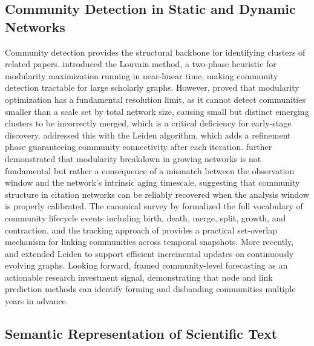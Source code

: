 \documentclass[a4paper,12pt]{article}
\begin{document}
\subsection{Community Detection in Static and Dynamic Networks}
Community detection provides the structural backbone for identifying clusters of related papers. \parencite{blondel_fast_2008} introduced the Louvain method, a two-phase heuristic for modularity maximization running in near-linear time, making community detection tractable for large scholarly graphs. However, \parencite{fortunato_resolution_2007} proved that modularity optimization has a fundamental resolution limit, as it cannot detect communities smaller than a scale set by total network size, causing small but distinct emerging clusters to be incorrectly merged, which is a critical deficiency for early-stage discovery. \parencite{traag_louvain_2019} addressed this with the Leiden algorithm, which adds a refinement phase guaranteeing community connectivity after each iteration. \parencite{medo_optimal_2019} further demonstrated that modularity breakdown in growing networks is not fundamental but rather a consequence of a mismatch between the observation window and the network's intrinsic aging timescale, suggesting that community structure in citation networks can be reliably recovered when the analysis window is properly calibrated. The canonical survey by \parencite{rossetti_community_2018} formalized the full vocabulary of community lifecycle events including birth, death, merge, split, growth, and contraction, and the tracking approach of \parencite{greene_tracking_2010} provides a practical set-overlap mechanism for linking communities across temporal snapshots. More recently, \parencite{lin_maintaining_2026} and \parencite{sahu_heuristic-based_2024} extended Leiden to support efficient incremental updates on continuously evolving graphs. Looking forward, \parencite{jung_analyzing_2014} framed community-level forecasting as an actionable research investment signal, demonstrating that node and link prediction methods can identify forming and disbanding communities multiple years in advance.

\subsection{Semantic Representation of Scientific Text }
\end{document}
